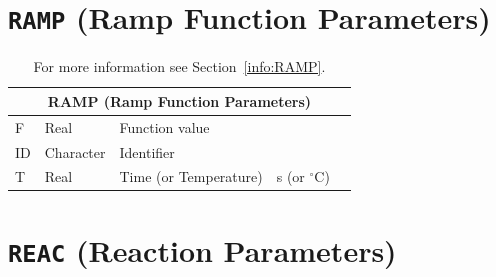 \documentclass[11pt]{book}
\begin{document}
\section{\texorpdfstring{{\tt RAMP}}{RAMP} (Ramp Function Parameters)}

\hspace{1in}

\begin{table}[H]
\caption{For more information see Section~\ref{info:RAMP}.}\label{tbl:RAMP}
\noindent
\begin{tabular*}{\textwidth}{@{\extracolsep{\fill}}|l|l|l|l|l|}
\hline
\multicolumn{5}{|c|}{{\ct RAMP} (Ramp Function Parameters)} \\ \hline \hline
{\ct F}         & Real          & Function value        &                       &     \\ \hline
{\ct ID}        & Character     & Identifier            &                       &     \\ \hline
{\ct T}         & Real          & Time (or Temperature) & s (or $^\circ$C)      &     \\ \hline
\end{tabular*}
\end{table}

\vspace{\baselineskip}

\vfill

\section{\texorpdfstring{{\tt REAC}}{REAC} (Reaction Parameters)}

\hspace{1in}
\end{document}
